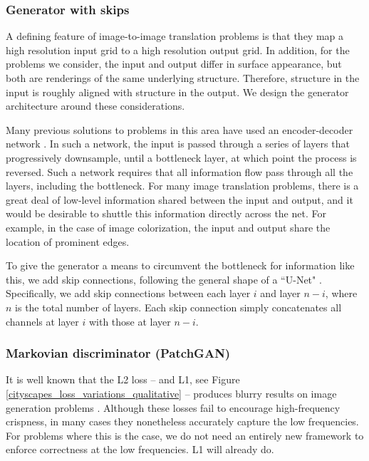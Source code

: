 \subsubsection{Generator with skips} A defining feature of image-to-image translation problems is that they map a high resolution input grid to a high resolution output grid. In addition, for the problems we consider, the input and output differ in surface appearance, but both are renderings of the same underlying structure. Therefore, structure in the input is roughly aligned with structure in the output. We design the generator architecture around these considerations.

Many previous solutions \cite{pathak2016context, wang2016generative, johnson2016perceptual, zhou2016learning, yoo2016pixel} to problems in this area have used an encoder-decoder network \cite{hinton2006reducing}. In such a network, the input is passed through a series of layers that progressively downsample, until a bottleneck layer, at which point the process is reversed. Such a network requires that all information flow pass through all the layers, including the bottleneck. For many image translation problems, there is a great deal of low-level information shared between the input and output, and it would be desirable to shuttle this information directly across the net. For example, in the case of image colorization, the input and output share the location of prominent edges.

To give the generator a means to circumvent the bottleneck for information like this, we add skip connections, following the general shape of a ``U-Net" \cite{ronneberger2015u}. Specifically, we add skip connections between each layer $i$ and layer $n-i$, where $n$ is the total number of layers. Each skip connection simply concatenates all channels at layer $i$ with those at layer $n-i$.

\subsubsection{Markovian discriminator (PatchGAN)} It is well known that the L2 loss -- and L1, see Figure \ref{cityscapes_loss_variations_qualitative} -- produces blurry results on image generation problems \cite{larsen2015autoencoding}. Although these losses fail to encourage high-frequency crispness, in many cases they nonetheless accurately capture the low frequencies. For problems where this is the case, we do not need an entirely new framework to enforce correctness at the low frequencies. L1 will already do.

